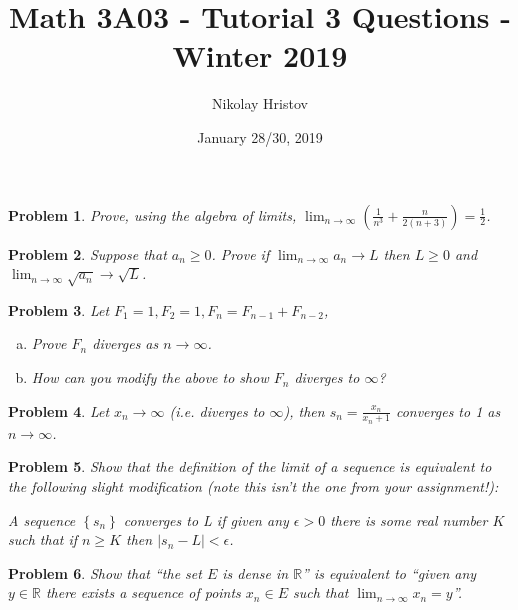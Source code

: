 \documentclass[11pt]{article}
\theoremstyle{plain}
\newtheorem{problem}{Problem}
\theoremstyle{remark}
\begin{document}
	\title{Math 3A03 - Tutorial 3 Questions - Winter 2019}
	\author{Nikolay Hristov}
	\date{January 28/30, 2019}
	\maketitle
	
	\begin{problem}
		Prove, using the algebra of limits, $\displaystyle \lim_{n\rightarrow \infty}\left(\frac 1 {n^3}+\frac{n}{2(n+3)}\right)= \frac 1 2$.
	\end{problem}

	\begin{problem}
		Suppose that $a_n\geq 0$. Prove if $\displaystyle \lim_{n\rightarrow \infty} a_n \rightarrow L$ then $L\geq 0$ and $\displaystyle \lim_{n\rightarrow \infty} \sqrt{a_n} \rightarrow \sqrt{L}$.
	\end{problem}

\begin{problem}
	Let $F_1=1, F_2=1, F_n=F_{n-1}+F_{n-2}$,
	
	\begin{enumerate}[a)]	
		\item Prove $F_n$ diverges as $n\rightarrow \infty$.
		
		\item How can you modify the above to show $F_n$ diverges to $\infty$?
	\end{enumerate}
\end{problem}

\begin{problem}
	Let $x_n\rightarrow \infty$ (i.e. diverges to $\infty$), then $s_n=\frac{x_n}{x_n+1}$ converges to 1 as $n\rightarrow\infty$.
\end{problem}


\begin{problem}
	Show that the definition of the limit of a sequence is equivalent to the following slight modification (note this isn't the one from your assignment!):
	
	A sequence $\left\{s_n\right\}$ converges to L if given any $\epsilon>0$ there is some real number $K$ such that if $n\geq K$ then $\left| s_n-L \right|<\epsilon$.
\end{problem}

\begin{problem}
	
	Show that ``the set $E$ is dense in $\mathbb R$'' is equivalent to ``given any $y\in \mathbb R$ there exists a sequence of points $x_n\in E$ such that $\displaystyle \lim_{n \rightarrow \infty} x_n=y$''.
\end{problem}
	
\end{document}
